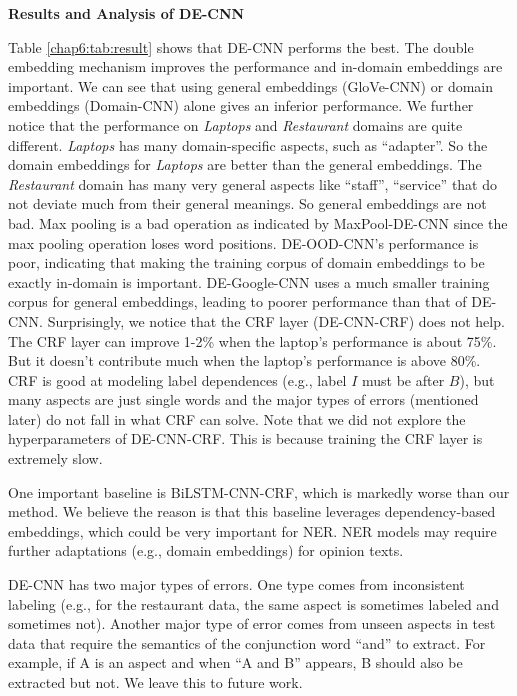 \textbf{Results and Analysis of DE-CNN}

Table \ref{chap6:tab:result} shows that DE-CNN performs the best. 
The double embedding mechanism improves the performance and in-domain embeddings are important. 
We can see that using general embeddings (GloVe-CNN) or domain embeddings (Domain-CNN) alone gives an inferior performance. 
We further notice that the performance on \textit{Laptops} and \textit{Restaurant} domains are quite different. 
\textit{Laptops} has many domain-specific aspects, such as ``adapter''. 
So the domain embeddings for \textit{Laptops} are better than the general embeddings. 
The \textit{Restaurant} domain has many very general aspects like ``staff'', ``service'' that do not deviate much from their general meanings. 
So general embeddings are not bad. 
Max pooling is a bad operation as indicated by MaxPool-DE-CNN since the max pooling operation loses word positions.
DE-OOD-CNN's performance is poor, indicating that making the training corpus of domain embeddings to be exactly in-domain is important.
DE-Google-CNN uses a much smaller training corpus for general embeddings, leading to poorer performance than that of DE-CNN.
Surprisingly, we notice that the CRF layer (DE-CNN-CRF) does not help.
The CRF layer can improve 1-2\% when the laptop's performance is about 75\%.
But it doesn't contribute much when the laptop's performance is above 80\%. 
CRF is good at modeling label dependences (e.g., label $I$ must be after $B$), but many aspects are just single words and the major types of errors (mentioned later) do not fall in what CRF can solve.
Note that we did not explore the hyperparameters of DE-CNN-CRF. This is because training the CRF layer is extremely slow. 

One important baseline is BiLSTM-CNN-CRF, which is markedly worse than our method. 
We believe the reason is that this baseline leverages dependency-based embeddings\cite{levy2014dependency}, 
which could be very important for NER.
NER models may require further adaptations (e.g., domain embeddings) for opinion texts. 

DE-CNN has two major types of errors.
One type comes from inconsistent labeling (e.g., for the restaurant data, the same aspect is sometimes labeled and sometimes not). 
Another major type of error comes from unseen aspects in test data that require the semantics of the conjunction word ``and'' to extract. For example, if A is an aspect and when ``A and B'' appears, B should also be extracted but not.
We leave this to future work.

